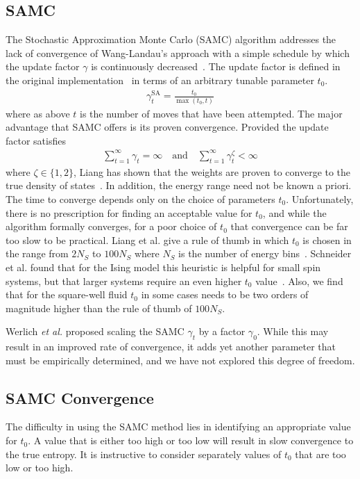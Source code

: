 \documentclass[letterpaper,twocolumn,amsmath,amssymb,pre,aps,10pt]{revtex4-1}
\begin{document}
\subsection{SAMC}
The Stochastic Approximation Monte Carlo (SAMC) algorithm addresses
the lack of convergence of Wang-Landau's approach with a simple
schedule by which the update factor $\gamma$ is continuously
decreased~\cite{liang2007stochastic, werlich2015stochastic,
  schneider2017convergence}.  The update factor is defined in the
original implementation~\cite{liang2007stochastic} in terms of an
arbitrary tunable parameter $t_0$.
\begin{align}
\gamma_{t}^{\text{SA}} =\frac{t_0}{\max(t_0,t)}
\end{align}
where as above $t$ is the number of moves that have been attempted.
The major advantage that SAMC offers is its proven convergence.
Provided the update factor satisfies
\begin{align}
\sum_{t=1}^\infty \gamma_{t} = \infty \quad\textrm{and}\quad
\sum_{t=1}^\infty \gamma_{t}^\zeta < \infty
\end{align}
where $\zeta \in \{1,2\}$, Liang has shown that the weights are proven
to converge to the true density of states~\cite{liang2006theory,
  liang2007stochastic}.  In addition, the energy range need not be
known a priori.  The time to converge depends only on the choice of
parameters $t_0$.  Unfortunately, there is no
prescription for finding an acceptable value for $t_0$, and
while the algorithm formally converges, for a poor choice of $t_0$
that convergence can be far too slow to be practical.
Liang et al. give a rule of thumb in which $t_0$
is chosen in the range from $2N_S$ to $100N_S$ where $N_S$ is the number
of energy bins~\cite{liang2007stochastic}.  Schneider et al. found
that for the
Ising model this heuristic is helpful for small spin
systems, but that larger systems require an even higher $t_0$
value~\cite{schneider2017convergence}.  Also, we find that for the square-well
fluid $t_0$ in some cases needs to be two orders of magnitude higher
than the rule of thumb of $100N_S$.

Werlich \emph{et al.} proposed scaling the SAMC $\gamma_t$ by a factor
$\gamma_0$.  While this may result in an improved rate of convergence,
it adds yet another parameter that must be empirically determined, and
we have not explored this degree of freedom.

\subsection{SAMC Convergence}\label{sec:samc-convergence}
The difficulty in using the SAMC method lies in identifying an appropriate
value for $t_0$.  A value that is either too high or too low will result
in slow convergence to the true entropy.  It is instructive to consider
separately values of $t_0$ that are too low or too high.
\end{document}
